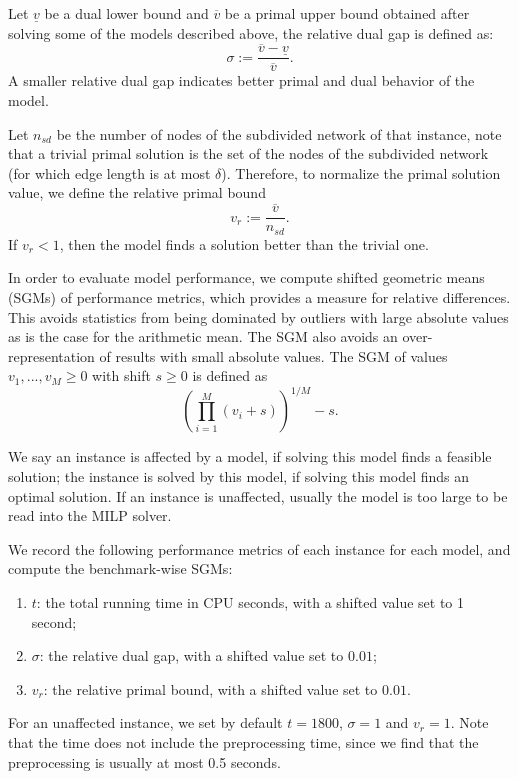 Let $\underline{v}$ be a dual lower bound and $\overline{v}$ be a primal upper bound obtained after solving some of the models described above,  the relative dual gap   is defined as:
\begin{equation*}
   \sigma := \frac{\overline{v} - \underline{v}}{\overline{v}}.
\end{equation*}
A smaller relative dual gap indicates better primal and dual behavior of the model.
 
Let $n_{sd}$ be the number of nodes of the subdivided network of that instance, note that  a trivial primal solution is the set of the nodes of the subdivided network (for which edge length is at most $\delta$). Therefore, to normalize the primal solution value, we define the relative primal bound  $$v_r := \frac{\overline{v}}{n_{sd}} .$$ If $v_r < 1$, then the model finds a solution better than the trivial one.


In order to evaluate model performance, we compute shifted geometric means (SGMs) of performance metrics, which provides a
measure for relative differences. This avoids statistics from being dominated by outliers with
large absolute values as is the case for the arithmetic mean. The SGM also avoids an over-representation of results with small absolute values.  The SGM of values $v_1,...,v_M \geq 0$ with shift $s \geq 0$ is defined
as
\begin{equation*}
  \left(\prod_{i=1}^M (v_i + s)\right)^{1/M} - s.
\end{equation*}


We say an instance is affected by a model, if solving this model finds a feasible solution; the instance is solved by this model, if solving this model finds an optimal solution. If an instance is unaffected, usually the model is too large to be read into the MILP solver.


We record the following performance metrics of each instance for each model, and compute the benchmark-wise SGMs:

 
\begin{enumerate}
	\item $t$: the total running time in CPU seconds, with a shifted value set to 1 second;
    
   \item $\sigma$: the relative dual gap, with a shifted value set to $0.01$;
  	\item $v_r$: the relative primal bound, with a shifted value set to $0.01$.
	 
\end{enumerate}
For an unaffected instance, we set by default $t= 1800$, $\sigma = 1$ and $v_r = 1$. Note that the time does not include the preprocessing time, since we find that the preprocessing is usually at most 0.5 seconds. \\

